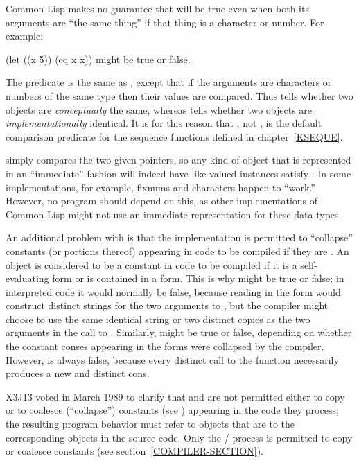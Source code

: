 \begin{defun}[Function]
Common Lisp makes no guarantee that  will be true even when both
its arguments are ``the same thing'' if that thing is a character or number.
For example:
\begin{lisp}
(let ((x 5)) (eq x x)) {\rm might be true or false.}
\end{lisp}
The predicate  is the same as , except that if the
arguments are characters or numbers of the same type then their
values are compared.  Thus  tells whether two objects
are {\it conceptually} the same, whereas  tells whether two
objects are {\it implementationally} identical.  It is for this reason
that , not , is the default comparison predicate
for the sequence functions defined in chapter~\ref{KSEQUE}.

\beforenoterule
\begin{implementation}
 simply compares the two given pointers,
so any kind of object that is represented in an ``immediate'' fashion
will indeed have like-valued instances satisfy .
In some implementations, for example,
fixnums and characters happen to ``work.''
However, no program should depend on this, as other implementations
of Common Lisp might not use an immediate representation for these data types.
\end{implementation}
\afternoterule

\begin{obsolete}
An additional problem with  is that the implementation is permitted
to ``collapse'' constants (or portions thereof)
appearing in code to be compiled if they are
.  An object is considered to be a constant in code to be compiled
if it is a self-evaluating form or is contained in a  form.
This is why  might be true or false; in interpreted
code it would normally be false, because reading in the
form  would construct distinct strings for the two
arguments to , but the compiler might choose to use the same
identical string or two distinct copies as the two arguments in the
call to .  Similarly,  might be true
or false, depending on whether the constant conses appearing in the
 forms were collapsed by the compiler.  However,
 is always false, because every distinct
call to the  function necessarily produces a new and distinct cons.
\end{obsolete}

\begin{newer}
X3J13 voted in March 1989  to clarify that
 and  are not permitted either to copy or
to coalesce (``collapse'') constants (see )
appearing in the code they process; the resulting
program behavior must refer to objects that are  to the
corresponding objects in the source code.
Only the / process is permitted
to copy or coalesce constants (see section~\ref{COMPILER-SECTION}).
\end{newer}
\end{defun}

